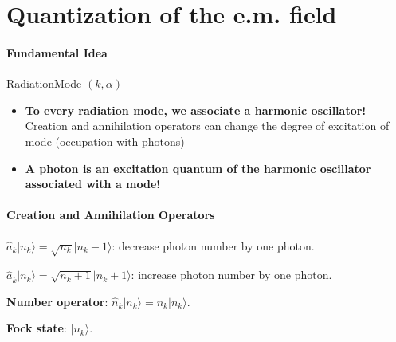 \documentclass[../../note.tex]{subfiles}
\begin{document}
\section{Quantization of the e.m. field}
\paragraph{Fundamental Idea}
RadiationMode $(k, \alpha)$
\begin{itemize}
    \item \textbf{To every radiation mode, we associate a harmonic oscillator!} Creation and annihilation operators can change the degree of excitation of mode (occupation with photons) 
    \item \textbf{A photon is an excitation quantum of the harmonic oscillator associated with a mode!}
\end{itemize}

\paragraph{Creation and Annihilation Operators}
$\hat{a}_k \vert n_k \rangle = \sqrt{n_k} \vert n_k -1 \rangle$: decrease photon number by one photon.

$\hat{a}_k^\dagger \vert n_k \rangle = \sqrt{n_k + 1}  \vert n_k +1 \rangle$: increase photon number by one photon.

\textbf{Number operator}: $\hat{n}_k \vert n_k \rangle = n_k \vert n_k \rangle$.

\textbf{Fock state}: $\vert n_k \rangle$.





\end{document}
